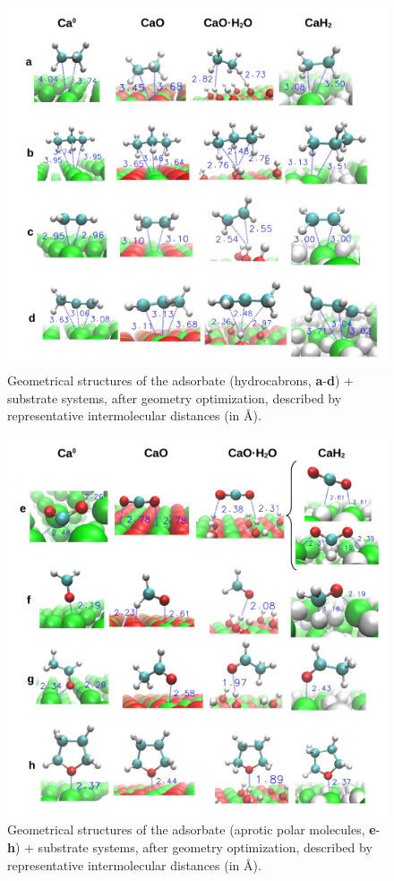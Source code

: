 \documentclass[%
aip,
amsmath,amssymb,
preprint,%
jcp,
showkeys,
]{revtex4-2}
\begin{document}
\begin{figure}[!b]
	\centering
	\includegraphics[width=\linewidth]{Figure8}
	\caption{Geometrical structures of the adsorbate (hydrocabrons, \textbf{a}-\textbf{d}) + substrate systems, after geometry optimization, described by representative intermolecular distances (in \si{\angstrom}).}
	\label{fig:distsad}
\end{figure}

\begin{figure}[!h]
	\centering
	\includegraphics[width=\linewidth]{Figure9}
	\caption{Geometrical structures of the adsorbate (aprotic polar molecules, \textbf{e}-\textbf{h}) + substrate systems, after geometry optimization, described by representative intermolecular distances (in \si{\angstrom}).}
	\label{fig:distsei}
\end{figure}
\end{document}
